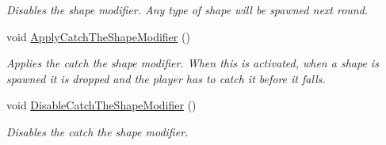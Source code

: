\begin{DoxyCompactItemize}
\begin{DoxyCompactList}\small\item\em Disables the shape modifier. Any type of shape will be spawned next round. \end{DoxyCompactList}\item 
void \hyperlink{class_multi_stack_1_1_turn_manager_a12f7087435556824abf79e14c8e52204}{Apply\+Catch\+The\+Shape\+Modifier} ()
\begin{DoxyCompactList}\small\item\em Applies the catch the shape modifier. When this is activated, when a shape is spawned it is dropped and the player has to catch it before it falls. \end{DoxyCompactList}\item 
void \hyperlink{class_multi_stack_1_1_turn_manager_a01e22ec6056a36b65ec0d8afd563dd8d}{Disable\+Catch\+The\+Shape\+Modifier} ()
\begin{DoxyCompactList}\small\item\em Disables the catch the shape modifier. \end{DoxyCompactList}\end{DoxyCompactItemize}
